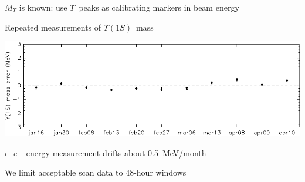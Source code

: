 \documentclass[landscape]{article}
\newcommand{\ups}{$\Upsilon$}
\newcommand{\us}{$\Upsilon(1S)$}
\newcommand{\ee}{$e^+e^-$}
\begin{document}
\begin{slide:energy}

$M_\Upsilon$ is known: use \ups\ peaks as calibrating markers in beam energy

\vfill
\begin{center}
Repeated measurements of \us\ mass

\includegraphics[width=\linewidth]{plots/beamenergydrift}
\end{center}

\vfill
\ee\ energy measurement drifts about 0.5~MeV/month

\vfill
We limit acceptable scan data to 48-hour windows

\end{slide:energy}
\end{document}
